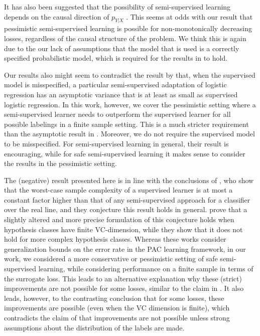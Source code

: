 \documentclass[twoside]{memoir}\usepackage[]{graphicx}\usepackage{xcolor}
\renewcommand{\cite}{\citep}
\begin{document}
It has also been suggested that the possibility of semi-supervised learning depends on the causal direction of $p_{Y|X}$ \cite{Scholkopf2012}. This seems at odds with our result that pessimistic semi-supervised learning is possible for non-monotonically decreasing losses, regardless of the causal structure of the problem. We think this is again due to the our lack of assumptions that the model that is used is a correctly specified probabilistic model, which is required for the results in \cite{Scholkopf2012} to hold.

Our results also might seem to contradict the result by \citet{Sokolovska2008} that, when the supervised model is misspecified, a particular semi-supervised adaptation of logistic regression has an asymptotic variance that is at least as small as supervised logistic regression. In this work, however, we cover the pessimistic setting where a semi-supervised learner needs to outperform the supervised learner for all possible labelings in a finite sample setting. This is a much stricter requirement than the asymptotic result in \citep{Sokolovska2008}. Moreover, we do not require the supervised model to be misspecified. 
For semi-supervised learning in general, their result is encouraging, while for safe semi-supervised learning it makes sense to consider the results in the pessimistic setting.

The (negative) result presented here is in line with the conclusions of \citet{Ben-David2008}, who show that the worst-case sample complexity of a supervised learner is at most a constant factor higher than that of any semi-supervised approach for a classifier over the real line, and they conjecture this result holds in general. \citet{Darnstadt2013} prove that a slightly altered and more precise formulation of this conjecture holds when hypothesis classes have finite VC-dimension, while they show that it does not hold for more complex hypothesis classes. Whereas these works consider generalization bounds on the error rate in the PAC learning framework, in our work, we considered a more conservative or pessimistic setting of safe semi-supervised learning, while considering performance on a finite sample in terms of the surrogate loss. This leads to an alternative explanation why these (strict) improvements are not possible for some losses, similar to the claim in \citet{Ben-David2008}. It also leads, however, to the contrasting conclusion that for some losses, these improvements are possible (even when the VC dimension is finite), which contradicts the claim of \citet{Ben-David2008} that improvements are not possible unless strong assumptions about the distribution of the labels are made.
\end{document}
